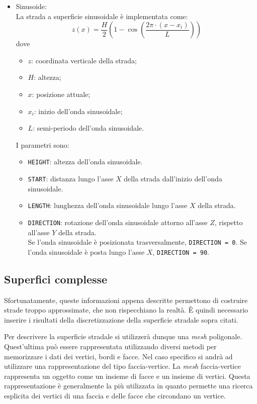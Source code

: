 \begin{itemize}
\begin{pseudoc}
	{ X_road	Z_left	Z_right }
	(XZ_DATA)
	-1.0e04	0	0
	0.0500	0	0
	0.1000	0	0
	0.1500	0	0
	... ... ...
	\end{pseudoc}
	\item Sinusoide:\\
	La strada a superficie sinusoidale è implementata come:
	\begin{equation}
	z(x)=\frac{H}{2}\left( 1 - \cos \left( \frac{2\pi \cdot (x-x_i)}{L} \right)   \right) 
	\end{equation}
	dove	
	\begin{itemize}
	 	\item $z$: coordinata verticale della strada;
	 	\item $H$: altezza;
	 	\item $x$: posizione attuale;
	 	\item $x_i$: inizio dell'onda sinusoidale;
	 	\item $L$: semi-periodo dell'onda sinusoidale.
	\end{itemize}
	I parametri sono:	
	\begin{itemize}
		\item \texttt{HEIGHT}: altezza dell'onda sinusoidale.
		\item \texttt{START}: distanza lungo l'asse $X$ della strada dall'inizio dell'onda sinusoidale.
		\item \texttt{LENGTH}: lunghezza dell'onda sinusoidale lungo l'asse $X$ della strada.
		\item \texttt{DIRECTION}: rotazione dell'onda sinusoidale attorno all'asse $Z$, rispetto all'asse $Y$ della strada.\\
		Se l'onda sinusoidale è posizionata trasversalmente, \texttt{DIRECTION = 0}. Se l'onda sinusoidale è posta lungo l'asse $X$, \texttt{DIRECTION = 90}.
	\end{itemize}
\end{itemize}
%
\subsection{Superfici complesse}
Sfortunatamente, queste informazioni appena descritte permettono di costruire strade troppo approssimate, che non rispecchiano la realtà. È quindi necessario inserire i risultati della discretizzazione della superficie stradale sopra citati.

Per descrivere la superficie stradale si utilizzerà dunque una \textit{mesh} poligonale. Quest'ultima può essere rappresentata utilizzando diversi metodi per memorizzare i dati dei vertici, bordi e facce. Nel caso specifico si andrà ad utilizzare una rappresentazione del tipo faccia-vertice. La \textit{mesh} faccia-vertice rappresenta un oggetto come un insieme di facce e un insieme di vertici. Questa rappresentazione è generalmente la più utilizzata in quanto permette una ricerca esplicita dei vertici di una faccia e delle facce che circondano un vertice.

